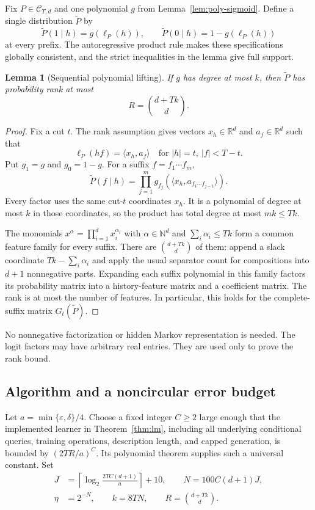 \documentclass[11pt]{article}
\newtheorem{lemma}[theorem]{Lemma}
\theoremstyle{definition}
\theoremstyle{remark}
\begin{document}
Fix $P\in\mathcal C_{T,d}$ and one polynomial $g$ from Lemma~\ref{lem:poly-sigmoid}. Define a single distribution $\widetilde P$ by
\begin{equation}\label{eq:surrogate}
\widetilde P(1\mid h)=g(\ell_P(h)),
\qquad
\widetilde P(0\mid h)=1-g(\ell_P(h))
\end{equation}
at every prefix. The autoregressive product rule makes these specifications globally consistent, and the strict inequalities in the lemma give full support.

\begin{lemma}[Sequential polynomial lifting]\label{lem:lift}
If $g$ has degree at most $k$, then $\widetilde P$ has probability rank at most
\[
R=\binom{d+Tk}{d}.
\]
\end{lemma}
\begin{proof}
Fix a cut $t$. The rank assumption gives vectors $x_h\in\mathbb R^d$ and $a_f\in\mathbb R^d$ such that
\[
\ell_P(hf)=\langle x_h,a_f\rangle
\quad\text{for }|h|=t,\ |f|<T-t.
\]
Put $g_1=g$ and $g_0=1-g$. For a suffix $f=f_1\cdots f_m$,
\[
\widetilde P(f\mid h)
=\prod_{j=1}^m
g_{f_j}\!\left(\langle x_h,a_{f_1\cdots f_{j-1}}\rangle\right).
\]
Every factor uses the same cut-$t$ coordinates $x_h$. It is a polynomial of degree at most $k$ in those coordinates, so the product has total degree at most $mk\le Tk$.

The monomials $x^\alpha=\prod_{i=1}^d x_i^{\alpha_i}$ with $\alpha\in\mathbb N^d$ and $\sum_i\alpha_i\le Tk$ form a common feature family for every suffix. There are $\binom{d+Tk}{d}$ of them: append a slack coordinate $Tk-\sum_i\alpha_i$ and apply the usual separator count for compositions into $d+1$ nonnegative parts. Expanding each suffix polynomial in this family factors its probability matrix into a history-feature matrix and a coefficient matrix. The rank is at most the number of features. In particular, this holds for the complete-suffix matrix $G_t(\widetilde P)$.
\end{proof}

No nonnegative factorization or hidden Markov representation is needed. The logit factors may have arbitrary real entries. They are used only to prove the rank bound.

\subsection{Algorithm and a noncircular error budget}

Let $a=\min\{\varepsilon,\delta\}/4$. Choose a fixed integer $C\ge2$ large enough that the implemented learner in Theorem~\ref{thm:lm}, including all underlying conditional queries, training operations, description length, and capped generation, is bounded by $(2TR/a)^C$. Its polynomial theorem supplies such a universal constant. Set
\begin{equation}\label{eq:fixed-parameters}
\begin{split}
J&=\left\lceil\log_2\frac{2TC(d+1)}a\right\rceil+10,
\qquad N=100C(d+1)J,\\
\eta&=2^{-N},\qquad k=8TN,\qquad R=\binom{d+Tk}{d}.
\end{split}
\end{equation}
\end{document}
